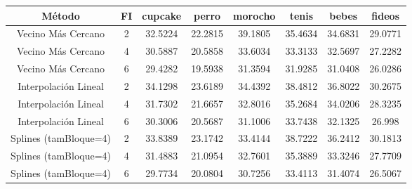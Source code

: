 \begin{tabular}{| c | c | c | c | c | c | c | c |} 
\hline
\textbf{Método} & \textbf{FI} & \textbf{cupcake} & \textbf{perro} & \textbf{morocho} & \textbf{tenis} & \textbf{bebes} & \textbf{fideos} \\ 
\hline
Vecino Más Cercano & 2 & 32.5224 &  22.2815 & 39.1805 &  35.4634 & 34.6831 & 29.0771 \\
\hline
Vecino Más Cercano & 4 & 30.5887 &  20.5858 & 33.6034 &  33.3133 & 32.5697 & 27.2282 \\
\hline
Vecino Más Cercano & 6 & 29.4282 &  19.5938 & 31.3594 &  31.9285 & 31.0408 &  26.0286 \\
\hline
Interpolación Lineal & 2 & 34.1298 &  23.6189 & 34.4392 &  38.4812 & 36.8022 &   30.2675 \\
\hline
Interpolación Lineal & 4 & 31.7302 &  21.6657 & 32.8016 &  35.2684 & 34.0206 &  28.3235 \\
\hline
Interpolación Lineal & 6 & 30.3006 & 20.5687  & 31.1006 &  33.7438 & 32.1325 & 26.998 \\
\hline
Splines (tamBloque=4) & 2 & 33.8389 &  23.1742 & 33.4144 &  38.7222 & 36.2412 & 30.1813 \\
\hline
Splines (tamBloque=4) & 4 & 31.4883 &  21.0954 & 32.7601 &  35.3889 & 33.3246 &  27.7709 \\
\hline
Splines (tamBloque=4) & 6 & 29.7734 &  20.0804 & 30.7256 & 33.4113  & 31.4074 & 26.5067 \\
\hline
\end{tabular}

\bigskip